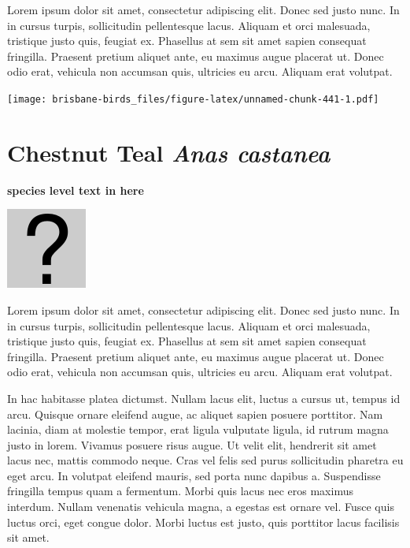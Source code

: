 \documentclass[]{book}
\let\origfigure\figure
\let\endorigfigure\endfigure
\renewenvironment{figure}[1][2] {
  \expandafter\origfigure\expandafter[H]
} {
  \endorigfigure
}
\begin{document}
Lorem ipsum dolor sit amet, consectetur adipiscing elit. Donec sed justo
nunc. In in cursus turpis, sollicitudin pellentesque lacus. Aliquam et
orci malesuada, tristique justo quis, feugiat ex. Phasellus at sem sit
amet sapien consequat fringilla. Praesent pretium aliquet ante, eu
maximus augue placerat ut. Donec odio erat, vehicula non accumsan quis,
ultricies eu arcu. Aliquam erat volutpat.

\texttt{[image: brisbane-birds\_files/figure-latex/unnamed-chunk-441-1.pdf]}

\section{\texorpdfstring{Chestnut Teal \emph{Anas
castanea}}{Chestnut Teal Anas castanea}}\label{chestnut-teal-anas-castanea}

\textbf{species level text in here}

\begin{figure}
\centering
\includegraphics{assets/missing.png}
\caption{No image for species}
\end{figure}

Lorem ipsum dolor sit amet, consectetur adipiscing elit. Donec sed justo
nunc. In in cursus turpis, sollicitudin pellentesque lacus. Aliquam et
orci malesuada, tristique justo quis, feugiat ex. Phasellus at sem sit
amet sapien consequat fringilla. Praesent pretium aliquet ante, eu
maximus augue placerat ut. Donec odio erat, vehicula non accumsan quis,
ultricies eu arcu. Aliquam erat volutpat.

In hac habitasse platea dictumst. Nullam lacus elit, luctus a cursus ut,
tempus id arcu. Quisque ornare eleifend augue, ac aliquet sapien posuere
porttitor. Nam lacinia, diam at molestie tempor, erat ligula vulputate
ligula, id rutrum magna justo in lorem. Vivamus posuere risus augue. Ut
velit elit, hendrerit sit amet lacus nec, mattis commodo neque. Cras vel
felis sed purus sollicitudin pharetra eu eget arcu. In volutpat eleifend
mauris, sed porta nunc dapibus a. Suspendisse fringilla tempus quam a
fermentum. Morbi quis lacus nec eros maximus interdum. Nullam venenatis
vehicula magna, a egestas est ornare vel. Fusce quis luctus orci, eget
congue dolor. Morbi luctus est justo, quis porttitor lacus facilisis sit
amet.
\end{document}
